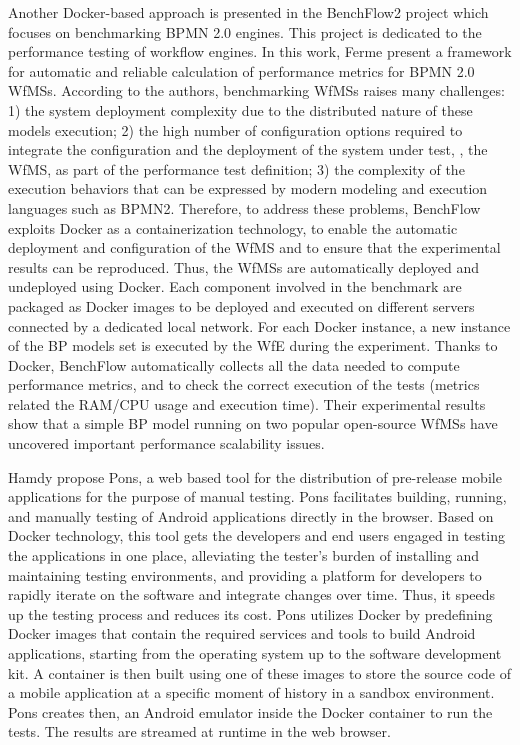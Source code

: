 Another Docker-based approach is presented in the BenchFlow2 project which focuses on benchmarking BPMN 2.0 engines\cite{ferme2015framework}. This project is dedicated to the performance testing of workflow engines. In this work, Ferme \etal present a framework for automatic and reliable calculation of performance metrics for BPMN 2.0 WfMSs. 
According to the authors, benchmarking WfMSs raises many challenges: 1) the system deployment complexity due to the distributed nature of these models execution; 2) the high number of configuration options required to integrate the configuration and the deployment of the system under test, \ie, the WfMS, as part of the performance test definition; 3) the complexity of the execution behaviors that can be expressed by modern modeling and execution languages such as BPMN2.
Therefore, to address these problems, BenchFlow exploits Docker as a containerization technology, to enable the automatic deployment and configuration of the WfMS and to ensure that the experimental results can be reproduced.
Thus, the WfMSs are automatically deployed and undeployed using Docker. Each component involved in the benchmark are packaged as Docker images
to be deployed and executed on different servers connected by a dedicated local
network. For each Docker instance, a new instance of the BP models set is executed by the WfE during the experiment.
Thanks to Docker, BenchFlow automatically collects all the data needed to compute performance metrics, and to check the correct execution of the tests (metrics related the RAM/CPU usage and execution time).
Their experimental results show that a simple BP model running on two popular
open-source WfMSs have uncovered important performance scalability issues. 

Hamdy \etal\cite{hamdy2016web} propose Pons, a web based tool for the distribution of pre-release mobile
applications for the purpose of manual testing. Pons facilitates building, running, and manually testing of Android applications directly in the browser. 
Based on Docker technology, this tool gets the developers and end users engaged in testing the applications in one
place, alleviating the tester's burden of installing and maintaining testing environments, and providing a platform for developers to rapidly iterate on the software and integrate changes over time. Thus, it speeds up the testing process and reduces its cost.
Pons utilizes Docker by predefining Docker images that
contain the required services and tools to build Android applications, starting from the operating system up to the
software development kit. A container is then built using one of these images to store the source code of
a mobile application at a specific moment of history in a
sandbox environment. Pons creates then, an Android emulator inside the Docker container to run the tests. The results are streamed at runtime in the web browser.

